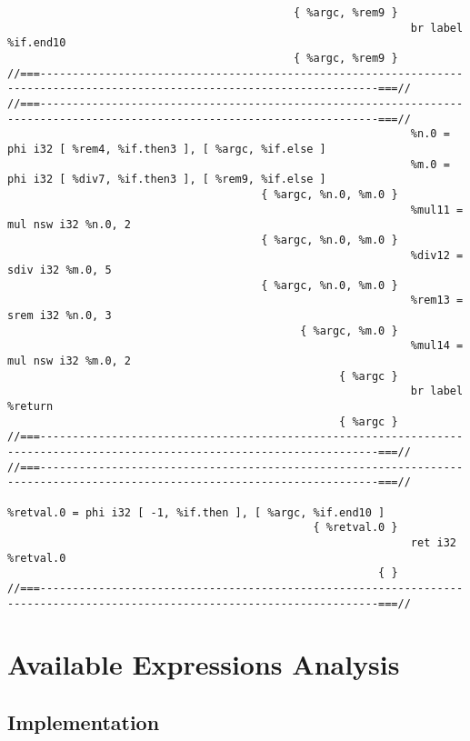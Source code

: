 \begin{verbatim}
                                            { %argc, %rem9 }
                                                              br label %if.end10
                                            { %argc, %rem9 }
//===--------------------------------------------------------------------------------------------------------------------------===//
//===--------------------------------------------------------------------------------------------------------------------------===//
                                                              %n.0 = phi i32 [ %rem4, %if.then3 ], [ %argc, %if.else ]
                                                              %m.0 = phi i32 [ %div7, %if.then3 ], [ %rem9, %if.else ]
                                       { %argc, %n.0, %m.0 }
                                                              %mul11 = mul nsw i32 %n.0, 2
                                       { %argc, %n.0, %m.0 }
                                                              %div12 = sdiv i32 %m.0, 5
                                       { %argc, %n.0, %m.0 }
                                                              %rem13 = srem i32 %n.0, 3
                                             { %argc, %m.0 }
                                                              %mul14 = mul nsw i32 %m.0, 2
                                                   { %argc }
                                                              br label %return
                                                   { %argc }
//===--------------------------------------------------------------------------------------------------------------------------===//
//===--------------------------------------------------------------------------------------------------------------------------===//
                                                              %retval.0 = phi i32 [ -1, %if.then ], [ %argc, %if.end10 ]
                                               { %retval.0 }
                                                              ret i32 %retval.0
                                                         { }
//===--------------------------------------------------------------------------------------------------------------------------===//
\end{verbatim}
    \endgroup
  
\section{Available Expressions Analysis}

\subsection{Implementation}

